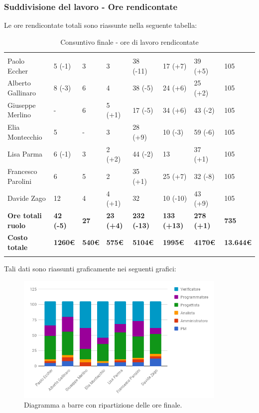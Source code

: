 \subsubsection{Suddivisione del lavoro - Ore rendicontate}
Le ore rendicontate totali sono riassunte nella seguente tabella:

\begin{table}[H]
	\centering
	\begin{tabular}{|C{4cm}|C{1cm}|C{1cm}|C{1cm}|C{1cm}|C{1cm}|C{1cm}|C{2.5cm}|}
		 & & &&&&&\\
		Paolo Eccher      & 5 (-1) & 3 & 3 & 38 (-11) & 17 (+7) & 39 (+5) & 105 \\
		\hline
		Alberto Gallinaro & 8 (-3) & 6 & 4 & 38 (-5) & 24 (+6) & 25 (+2) & 105 \\
		\hline
		Giuseppe Merlino  & - & 6 & 5 (+1) & 17 (-5) & 34 (+6) & 43 (-2) & 105 \\
		\hline
		Elia Montecchio   & 5 & - & 3 & 28 (+9) & 10 (-3) & 59 (-6) & 105 \\
		\hline
		Lisa Parma        & 6 (-1) & 3 & 2 (+2) & 44 (-2) & 13 & 37 (+1) & 105 \\
		\hline
		Francesco Parolini& 6 & 5 & 2 & 35 (+1) & 25 (+7) & 32 (-8) & 105 \\
		\hline
		Davide Zago       & 12 & 4 & 4 (+1) & 32 & 10 (-10) & 43 (+9) & 105 \\
		\hline
		\textbf{Ore totali ruolo}  & \textbf{42 (-5)} & \textbf{27} & \textbf{23 (+4)} & \textbf{232 (-13)} & \textbf{133 (+13)} & \textbf{278 (+1)} & \textbf{735} \\
		\textbf{Costo totale}  & \textbf{1260\euro} & \textbf{540\euro} & \textbf{575\euro} & \textbf{5104\euro} & \textbf{1995\euro} & \textbf{4170\euro} & \textbf{13.644\euro} \\
	\end{tabular}
	\caption{Consuntivo finale - ore di lavoro rendicontate}
\end{table}

Tali dati sono riassunti graficamente nei seguenti grafici:


\begin{figure}[H] 
	\centering 
	\includegraphics[width=0.9\textwidth]{images/BarreFinaleRendicontate.png} 
	\caption{Diagramma a barre con ripartizione delle ore finale.}
	\label{BarreFinaleRendicontate}
\end{figure}

